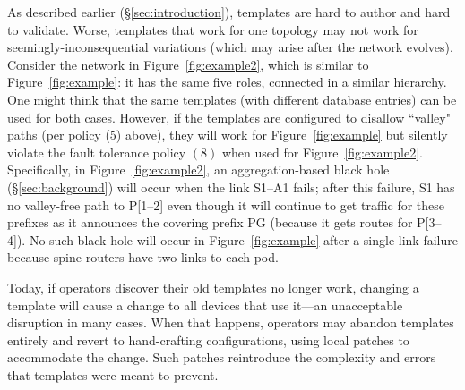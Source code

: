 \documentclass[numbers, 10pt, preprint]{sigplanconf}
\begin{document}

As described earlier (\S\ref{sec:introduction}), templates are hard to author and hard to validate. Worse, templates that work for one topology may not work for seemingly-inconsequential variations (which may arise after the network evolves).
Consider the network in Figure~\ref{fig:example2}, which is similar to Figure~\ref{fig:example}: it has the same five roles, connected in a similar hierarchy. One might think that the same templates (with different database entries) can be used for both cases. However, if the templates are configured to disallow ``valley" paths (per policy (5) above), they will work for Figure~\ref{fig:example} but silently violate the fault tolerance policy $(8)$ when used for Figure~\ref{fig:example2}.  Specifically, in Figure~\ref{fig:example2}, an aggregation-based black hole (\S\ref{sec:background}) will occur when the link S1--A1 fails; after this failure, S1 has no valley-free path to P[1--2] even though it will continue to get traffic for these prefixes as it announces the covering prefix PG (because it gets routes for P[3--4]). No such black hole will occur in Figure~\ref{fig:example} after a single link failure because spine routers have two links to each pod.


Today, if operators discover their old templates no longer work, changing a template will
cause a change to all devices that use it---an unacceptable disruption in many cases.  When that happens, operators may abandon templates entirely and revert to hand-crafting configurations, using local patches to accommodate the change.
Such patches reintroduce the complexity and errors that templates were meant to prevent.


\end{document}
